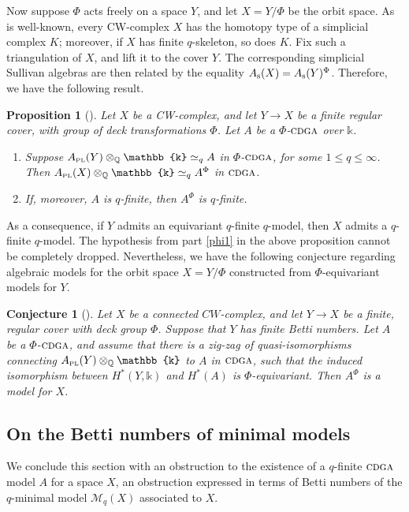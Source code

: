 \documentclass{article}
\numberwithin{equation}{section}
\newtheorem{proposition}[theorem]{Proposition}
\newtheorem{conjecture}[theorem]{Conjecture}
\theoremstyle{definition}
\newcommand{\Q}{\mathbb{Q}}
\renewcommand{\k}{\mathbb{k}}
\newcommand{\M}{\mathcal{M}}
\newcommand{\cdga}{\ensuremath{\textsc{cdga}}}
\newcommand{\apl}{A_{\scriptscriptstyle{{\rm PL}}}}
\begin{document}
Now suppose $\Phi$ acts freely on a space $Y$, 
and let $X=Y/\Phi$ be the orbit space.  
As is well-known, every CW-complex $X$ has the homotopy type 
of a simplicial complex $K$; moreover, if $X$ has finite $q$-skeleton, 
so does $K$. Fix such a triangulation of $X$, and lift it to the cover $Y$.   
The corresponding simplicial Sullivan algebras are then related by the 
equality $A_{\rm s}(X)=A_{\rm s}(Y)^{\Phi}$. Therefore, we have the following result.

\begin{proposition}[\cite{PS-jlms}]
\label{prop:equiv}
Let $X$ be a CW-complex, and let $Y\to X$ be a finite regular  
cover, with group of deck transformations $\Phi$.  Let $A$ 
be a $\Phi$-$\cdga$ over $\k$.
\begin{enumerate}
\item  \label{phi1}
Suppose $\apl(Y)\otimes_{\Q}\k \simeq_q A$ in 
$\Phi$-$\cdga$, for some $1\le q\le \infty$. Then 
$\apl(X)\otimes_{\Q}\k \simeq_q A^{\Phi}$ in $\cdga$. 
\item  \label{phi2}
If, moreover, $A$ is $q$-finite, then $A^{\Phi}$ is 
$q$-finite.
\end{enumerate}
\end{proposition}

As a consequence, if $Y$ admits an equivariant $q$-finite $q$-model,   
then $X$ admits a $q$-finite $q$-model.  The hypothesis from 
part \eqref{phi1} in the above proposition cannot be completely dropped. 
Nevertheless, we have the following conjecture regarding algebraic 
models for the orbit space $X=Y/\Phi$ constructed from $\Phi$-equivariant 
models for $Y$.

\begin{conjecture}[\cite{PS-jlms}]
\label{conj:equiv}
Let $X$ be a connected $CW$-complex, and let $Y \to X$ be a finite,  
regular cover with deck group $\Phi$. Suppose that $Y$ has finite Betti 
numbers. Let $A$ be a $\Phi$-$\cdga$, and assume that there is a zig-zag of 
quasi-isomorphisms connecting $\apl (Y)\otimes_{\Q}\k$ to $A$ in $\cdga$,
such that the induced isomorphism between $H^{*}(Y,\k)$ and $H^{*}(A)$ is 
$\Phi$-equivariant. Then $A^{\Phi}$ is a model for $X$.
\end{conjecture}

\subsection{On the Betti numbers of minimal models}
\label{subsec:infobs}
We conclude this section with an obstruction to the existence of a $q$-finite 
$\cdga$ model $A$ for a space $X$, an obstruction expressed 
in terms of Betti numbers of the $q$-minimal model $\M_q(X)$ 
associated to $X$.
\end{document}
